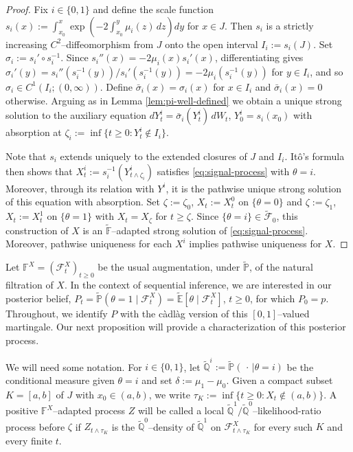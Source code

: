 \documentclass[11pt, reqno]{amsart}
\theoremstyle{plain}
\theoremstyle{remark}
\numberwithin{equation}{section}
\begin{document}
\begin{proof}
Fix $i\in\{0,1\}$ and define the scale function $s_i(x)
  :=
  \int_{x_0}^x
  \exp\left(
    -2\int_{x_0}^y\mu_i(z)\,dz
  \right)dy$ for $x\in J$.
Then $s_i$ is a strictly increasing $C^2$--diffeomorphism from $J$
onto the open interval $I_i:=s_i(J)$. Set $\sigma_i:=s_i'\circ s_i^{-1}$.
Since $s_i''(x)=-2\mu_i(x)s_i'(x)$,  differentiating gives $\sigma_i'(y)
  =
  s_i''(s_i^{-1}(y))/
       s_i'(s_i^{-1}(y))
  =
  -2\mu_i(s_i^{-1}(y))$ for $y\in I_i$,
and so $\sigma_i\in C^1(I_i;(0,\infty))$. Define $\bar{\sigma}_i(x) = \sigma_i(x)$ for $x\in I_i$ and $\bar{\sigma}_i(x)=0$ otherwise. Arguing as in Lemma \ref{lem:pi-well-defined} we obtain a unique strong solution to the auxiliary equation $dY_t^i=\bar\sigma_i(Y_t^i)\,dW_t$, $Y_0^i=s_i(x_0)$ with absorption at $\zeta_i:=\inf\{t\geq0:Y_t^i\notin I_i\}$.

%
%
%
%
%
%
%
%
%
%
%
%

Note that $s_i$ extends uniquely to the extended closures of $J$ and $I_i$. It\^o's formula then shows that $X_t^i:=s_i^{-1}(Y_{t\wedge \zeta_i}^i)$ satisfies \eqref{eq:signal-process} with $\theta=i$.
%
%
%
%
%
%
%
%
Moreover, through its relation with $Y^i$, it is the pathwise unique strong solution of this equation with absorption.
Set $\zeta:=\zeta_0$, $X_t:=X_t^0$ on $\{\theta=0\}$ and $\zeta:=\zeta_1$, $X_t:=X_t^1$ on $\{\theta=1\}$
with $X_t = X_\zeta$ for $t\geq\zeta$.  Since
$\{\theta=i\}\in\widetilde{\mathcal F}_0$, this construction of $X$ is an $\widetilde{\mathbb F}$--adapted strong solution of \eqref{eq:signal-process}. Moreover, pathwise uniqueness for
each $X^i$ implies pathwise uniqueness for $X$.
\end{proof}

Let $\mathbb F^X=(\mathcal F_t^X)_{t\geq0}$ be the usual augmentation,
under $\widetilde{\mathbb P}$, of the natural filtration of $X$. In the context of sequential inference, we are interested in our posterior belief,  $P_t=\widetilde{\mathbb{P}}(\theta=1\mid\mathcal{F}_t^X)=  \widetilde{\mathbb E}[\theta\mid\mathcal F_t^X]$, $t\geq0$,
for which $P_0=p$. Throughout, we identify $P$ with the c\`adl\`ag version of this $[0,1]$--valued martingale. Our next proposition will provide a characterization of this posterior process.

We will need some notation. For
$i\in\{0,1\}$, let
$\widetilde{\mathbb{Q}}^i:=\widetilde{\mathbb P}(\,\cdot\,\vert\theta=i)$ be the conditional measure given $\theta=i$ and set
$\delta:=\mu_1-\mu_0$. Given a compact subset $K=[a,b]$ of $J$ with $x_0\in(a,b)$, we write
$\tau_K:=\inf\{t\geq0:X_t\notin(a,b)\}$. A positive
$\mathbb F^X$--adapted process $Z$ will be called a local
$\widetilde{\mathbb{Q}}^1/\widetilde{\mathbb{Q}}^0$--likelihood-ratio process before $\zeta$ if
$Z_{t\wedge\tau_K}$ is the $\widetilde{\mathbb{Q}}^0$--density of $\widetilde{\mathbb{Q}}^1$ on
$\mathcal F^X_{t\wedge\tau_K}$ for every such $K$ and every finite $t$.
\end{document}
